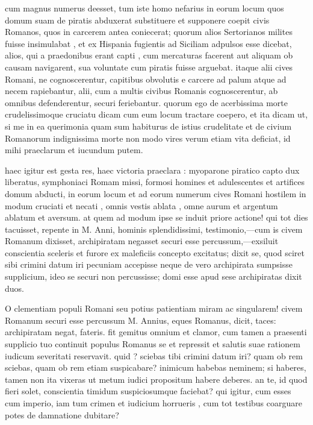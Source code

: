  cum magnus numerus deesset, tum iste homo nefarius in eorum locum quos domum suam de piratis abduxerat substituere et supponere coepit civis Romanos, quos in carcerem antea coniecerat; quorum alios Sertorianos milites fuisse insimulabat , et ex Hispania fugientis ad Siciliam adpulsos esse dicebat, alios, qui a praedonibus erant capti , cum mercaturas facerent aut aliquam ob causam navigarent, sua voluntate cum piratis fuisse arguebat. itaque alii cives Romani, ne cognoscerentur, capitibus obvolutis e carcere ad palum atque ad necem rapiebantur, alii, cum a multis civibus Romanis cognoscerentur, ab omnibus defenderentur, securi feriebantur. quorum ego de acerbissima morte crudelissimoque cruciatu dicam cum eum locum tractare coepero, et ita dicam ut, si me in ea querimonia quam sum habiturus de istius crudelitate et de civium Romanorum indignissima morte non modo vires verum etiam vita deficiat, id mihi praeclarum et iucundum putem.

 haec igitur est gesta res, haec victoria praeclara : myoparone piratico capto dux liberatus, symphoniaci Romam missi, formosi homines et adulescentes et artifices domum abducti, in eorum locum et ad eorum numerum cives Romani hostilem in modum cruciati et necati , omnis vestis ablata , omne aurum et argentum ablatum et aversum. at quem ad modum ipse se induit priore actione! qui tot dies tacuisset, repente in M. Anni, hominis splendidissimi, testimonio,—cum is civem Romanum dixisset, archipiratam negasset securi esse percussum,—exsiluit conscientia sceleris et furore ex maleficiis concepto excitatus; dixit se, quod sciret sibi crimini datum iri pecuniam accepisse neque de vero archipirata sumpsisse supplicium, ideo se securi non percussisse; domi esse apud sese archipiratas dixit duos.

 O clementiam populi Romani seu potius patientiam miram ac singularem! civem Romanum securi esse percussum M. Annius, eques Romanus, dicit, taces: archipiratam negat, fateris. fit gemitus omnium et clamor, cum tamen a praesenti supplicio tuo continuit populus Romanus se et repressit et salutis suae rationem iudicum severitati reservavit. quid ? sciebas tibi crimini datum iri? quam ob rem sciebas, quam ob rem etiam suspicabare? inimicum habebas neminem; si haberes, tamen non ita vixeras ut metum iudici propositum habere deberes. an te, id quod fieri solet, conscientia timidum suspiciosumque faciebat? qui igitur, cum esses cum imperio, iam tum crimen et iudicium horrueris , cum tot testibus coarguare potes de damnatione dubitare?

